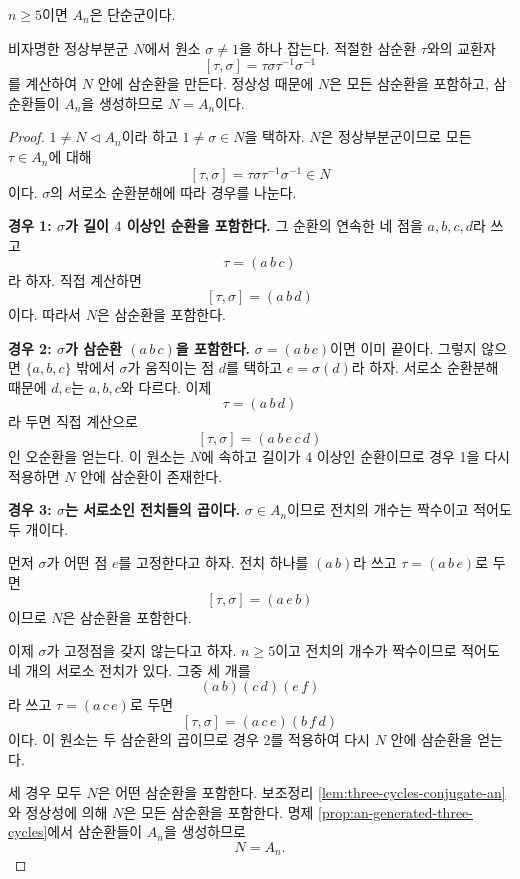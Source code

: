 \begin{theorem}
\label{thm:an-simple}
$n\ge5$이면 $A_n$은 단순군이다.
\end{theorem}

\begin{proofidea}
비자명한 정상부분군 $N$에서 원소 $\sigma\ne1$을 하나 잡는다. 적절한 삼순환 $\tau$와의 교환자
\[
  [\tau,\sigma]=\tau\sigma\tau^{-1}\sigma^{-1}
\]
를 계산하여 $N$ 안에 삼순환을 만든다. 정상성 때문에 $N$은 모든 삼순환을 포함하고, 삼순환들이 $A_n$을 생성하므로 $N=A_n$이다.
\end{proofidea}

\begin{proof}
$1\ne N\triangleleft A_n$이라 하고 $1\ne\sigma\in N$을 택하자. $N$은 정상부분군이므로 모든 $\tau\in A_n$에 대해
\[
  [\tau,\sigma]=\tau\sigma\tau^{-1}\sigma^{-1}\in N
\]
이다. $\sigma$의 서로소 순환분해에 따라 경우를 나눈다.

\medskip
\noindent\textbf{경우 1: $\sigma$가 길이 $4$ 이상인 순환을 포함한다.}
그 순환의 연속한 네 점을 $a,b,c,d$라 쓰고
\[
  \tau=(a\,b\,c)
\]
라 하자. 직접 계산하면
\[
  [\tau,\sigma]=(a\,b\,d)
\]
이다. 따라서 $N$은 삼순환을 포함한다.

\medskip
\noindent\textbf{경우 2: $\sigma$가 삼순환 $(a\,b\,c)$을 포함한다.}
$\sigma=(a\,b\,c)$이면 이미 끝이다. 그렇지 않으면 $\{a,b,c\}$ 밖에서 $\sigma$가 움직이는 점 $d$를 택하고 $e=\sigma(d)$라 하자. 서로소 순환분해 때문에 $d,e$는 $a,b,c$와 다르다. 이제
\[
  \tau=(a\,b\,d)
\]
라 두면 직접 계산으로
\[
  [\tau,\sigma]=(a\,b\,e\,c\,d)
\]
인 오순환을 얻는다. 이 원소는 $N$에 속하고 길이가 $4$ 이상인 순환이므로 경우 1을 다시 적용하면 $N$ 안에 삼순환이 존재한다.

\medskip
\noindent\textbf{경우 3: $\sigma$는 서로소인 전치들의 곱이다.}
$\sigma\in A_n$이므로 전치의 개수는 짝수이고 적어도 두 개이다.

먼저 $\sigma$가 어떤 점 $e$를 고정한다고 하자. 전치 하나를 $(a\,b)$라 쓰고 $\tau=(a\,b\,e)$로 두면
\[
  [\tau,\sigma]=(a\,e\,b)
\]
이므로 $N$은 삼순환을 포함한다.

이제 $\sigma$가 고정점을 갖지 않는다고 하자. $n\ge5$이고 전치의 개수가 짝수이므로 적어도 네 개의 서로소 전치가 있다. 그중 세 개를
\[
  (a\,b)(c\,d)(e\,f)
\]
라 쓰고 $\tau=(a\,c\,e)$로 두면
\[
  [\tau,\sigma]=(a\,c\,e)(b\,f\,d)
\]
이다. 이 원소는 두 삼순환의 곱이므로 경우 2를 적용하여 다시 $N$ 안에 삼순환을 얻는다.

세 경우 모두 $N$은 어떤 삼순환을 포함한다. 보조정리 \ref{lem:three-cycles-conjugate-an}와 정상성에 의해 $N$은 모든 삼순환을 포함한다. 명제 \ref{prop:an-generated-three-cycles}에서 삼순환들이 $A_n$을 생성하므로
\[
  N=A_n.
\]
\end{proof}

